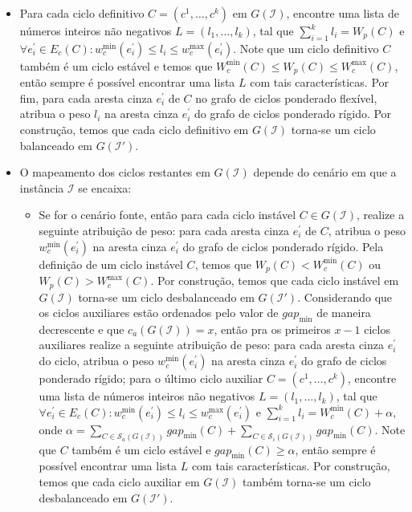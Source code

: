 \begin{itemize}
  \item Para cada ciclo definitivo $C=(c^1,\dots,c^k)$ em $G(\mathcal{I})$, encontre uma lista de números inteiros não negativos $L=(l_1,\dots,l_k)$, tal que $\sum_{i=1}^{k}l_i = W_p(C)$ e $\forall e^{\prime}_i \in E_c(C): w^{\min}_c(e^{\prime}_i) \le l_i \le w^{\max}_c(e^{\prime}_i)$. Note que um ciclo definitivo $C$ também é um ciclo estável e temos que $W^{\min}_c(C) \le W_p(C) \le W^{\max}_c(C)$, então sempre é possível encontrar uma lista $L$ com tais características. Por fim, para cada aresta cinza $e^{\prime}_i$ de $C$ no grafo de ciclos ponderado flexível, atribua o peso $l_i$ na aresta cinza $e^{\prime}_i$ do grafo de ciclos ponderado rígido. Por construção, temos que cada ciclo definitivo em $G(\mathcal{I})$ torna-se um ciclo balanceado em $G(\mathcal{I}')$.
  \item O mapeamento dos ciclos restantes em $G(\mathcal{I})$ depende do cenário em que a instância $\mathcal{I}$ se encaixa: 

  \begin{itemize}
    \item Se for o cenário fonte, então para cada ciclo instável $C \in G(\mathcal{I})$, realize a seguinte atribuição de peso: para cada aresta cinza $e^{\prime}_i$ de $C$, atribua o peso $w^{\min}_c(e^{\prime}_i)$ na aresta cinza $e^{\prime}_i$ do grafo de ciclos ponderado rígido. Pela definição de um ciclo instável $C$, temos que $W_p(C)  < W^{\min}_c(C)$ ou $W_p(C) > W^{\max}_c(C)$. Por construção, temos que cada ciclo instável em $G(\mathcal{I})$ torna-se um ciclo desbalanceado em $G(\mathcal{I}')$. Considerando que os ciclos auxiliares estão ordenados pelo valor de $gap_{\min}$ de maneira decrescente e que $c_a(G(\mathcal{I})) = x$, então pra os primeiros $x-1$ ciclos auxiliares realize a seguinte atribuição de peso: para cada aresta cinza $e^{\prime}_i$ do ciclo, atribua o peso $w^{\min}_c(e^{\prime}_i)$ na aresta cinza $e^{\prime}_i$ do grafo de ciclos ponderado rígido; para o último ciclo auxiliar $C=(c^1,\dots,c^k)$, encontre uma lista de números inteiros não negativos $L=(l_1,\dots,l_k)$, tal que $\forall e^{\prime}_i \in E_c(C): w^{\min}_c(e^{\prime}_i) \le l_i \le w^{\max}_c(e^{\prime}_i)$ e $\sum_{i=1}^{k}l_i = W^{\min}_c(C) + \alpha$, onde $\alpha = \sum_{C \in \mathcal{S}_a(G(\mathcal{I}))} gap_{\min}(C) + \sum_{C \in \mathcal{S}_i(G(\mathcal{I}))} gap_{\min}(C)$. Note que $C$ também é um ciclo estável e $gap_{\min}(C) \ge \alpha$, então sempre é possível encontrar uma lista $L$ com tais características. Por construção, temos que cada ciclo auxiliar em $G(\mathcal{I})$ também torna-se um ciclo desbalanceado em $G(\mathcal{I}')$.


\end{itemize}
\end{itemize}
